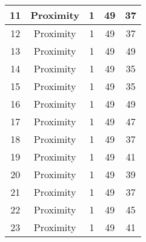 \documentclass[results.tex]{subfiles}
\begin{document}
\begin{center}
\begin{tabular}{| c || c | c | c | c |}
            \hline
            11                      & Proximity                    & 1                      & 49                      & 37                   \\
            \hline
            12                      & Proximity                    & 1                      & 49                      & 37                   \\
            \hline
            13                      & Proximity                    & 1                      & 49                      & 49                   \\
            \hline
            14                      & Proximity                    & 1                      & 49                      & 35                   \\
            \hline
            15                      & Proximity                    & 1                      & 49                      & 35                   \\
            \hline
            16                      & Proximity                    & 1                      & 49                      & 49                   \\
            \hline
            17                      & Proximity                    & 1                      & 49                      & 47                   \\
            \hline
            18                      & Proximity                    & 1                      & 49                      & 37                   \\
            \hline
            19                      & Proximity                    & 1                      & 49                      & 41                   \\
            \hline
            20                      & Proximity                    & 1                      & 49                      & 39                   \\
            \hline
            21                      & Proximity                    & 1                      & 49                      & 37                   \\
            \hline
            22                      & Proximity                    & 1                      & 49                      & 45                   \\
            \hline
            23                      & Proximity                    & 1                      & 49                      & 41                   \\

\end{tabular}
\end{center}
\end{document}
